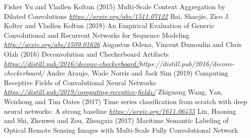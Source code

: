 \begin{vbframe}
{\begin{thebibliography}{99}
 Fisher Yu and Vladlen Koltun (2015)
\newblock Multi-Scale Context Aggregation by Dilated Convolutions
\newblock \emph{\url{https://arxiv.org/abs/1511.07122}}
 Bai, Shaojie,  Zico J. Kolter and Vladlen Koltun (2018)
\newblock An Empirical Evaluation of Generic Convolutional and Recurrent Networks for Sequence Modeling
\newblock \emph{\url{http://arxiv.org/abs/1509.01626}}
 Augustus Odena, Vincent Dumoulin and Chris Olah (2016)
\newblock Deconvolution and Checkerboard Artifacts
\newblock \emph{\url{https://distill.pub/2016/deconv-checkerboard/}{https://distill.pub/2016/deconv-checkerboard/}}
 Andre Araujo, Wade Norris and Jack Sim (2019)
\newblock Computing Receptive Fields of Convolutional Neural Networks
\newblock \emph{\url{https://distill.pub/2019/computing-receptive-fields/}}
 Zhiguang Wang, Yan, Weizhong and Tim Oates (2017)
\newblock Time series classification from scratch with deep neural networks: A
strong baseline
\newblock \emph{\url{https://arxiv.org/1611.06455}}
 Lin, Haoning and Shi, Zhenwei and Zou, Zhengxia (2017)
\newblock Maritime Semantic Labeling of Optical Remote Sensing Images with Multi-Scale Fully Convolutional Network

\end{thebibliography}
}
\end{vbframe}




\endlecture
